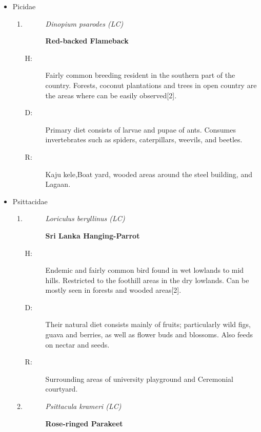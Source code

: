 \begin{itemize}
\newpage
\item%
Picidae%
\begin{enumerate}%
\item%
\begin{description}%
\item[]%
\textit{Dinopium psarodes (LC)}%
\item[]%
\textbf{Red{-}backed Flameback}%
\end{description}%
\begin{description}%
\item[H: ]%
Fairly common breeding resident in the southern part of the country. Forests, coconut plantations and trees in open country are the areas where can be easily observed{[}2{]}.%
\item[D: ]%
Primary diet consists of larvae and pupae of ants. Consumes invertebrates such as spiders, caterpillars, weevils, and beetles.%
\item[R: ]%
Kaju kele,Boat yard, wooded areas around the steel building, and Lagaan.%
\end{description}%
\end{enumerate}%
\item%
Psittacidae%
\begin{enumerate}%
\item%
\begin{description}%
\item[]%
\textit{Loriculus beryllinus (LC)}%
\item[]%
\textbf{Sri Lanka Hanging{-}Parrot}%
\end{description}%
\begin{description}%
\item[H: ]%
Endemic and fairly common bird found in wet lowlands to mid hills. Restricted to the foothill areas in the dry lowlands. Can be mostly seen in forests and wooded areas{[}2{]}.%
\item[D: ]%
Their natural diet consists mainly of fruits; particularly wild figs, guava and berries, as well as flower buds and blossoms. Also feeds on nectar and seeds.%
\item[R: ]%
Surrounding areas of university playground and Ceremonial courtyard.%
\end{description}%
\item%
\begin{description}%
\item[]%
\textit{Psittacula krameri (LC)}%
\item[]%
\textbf{Rose{-}ringed Parakeet}%
\end{description}%

\end{enumerate}
\end{itemize}
